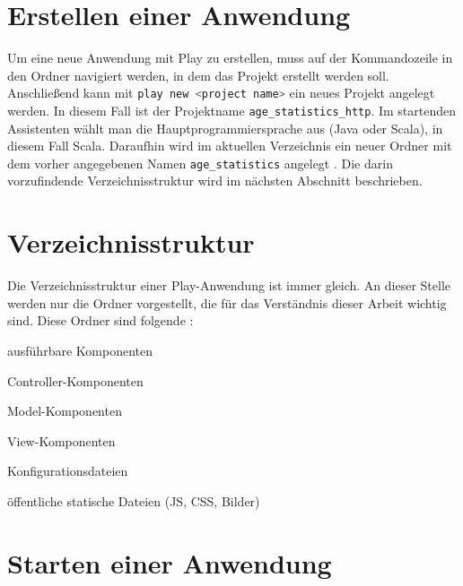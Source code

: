 

\section{Erstellen einer Anwendung} %
\label{sec:erstellen_einer_anwendung}

Um eine neue Anwendung mit Play zu erstellen, muss auf der Kommandozeile in den Ordner navigiert werden, in dem das Projekt erstellt werden soll.
Anschließend kann mit \lstinline[language=sh]|play new <project name>| ein neues Projekt angelegt werden.
In diesem Fall ist der Projektname \lstinline|age_statistics_http|.
Im startenden Assistenten wählt man die Hauptprogrammiersprache aus (Java oder Scala), in diesem Fall Scala.
Daraufhin wird im aktuellen Verzeichnis ein neuer Ordner mit dem vorher angegebenen Namen \lstinline|age_statistics| angelegt \cite[vgl.][S.~10]{play_for_scala}.
Die darin vorzufindende Verzeichnisstruktur wird im nächsten Abschnitt beschrieben.



\section{Verzeichnisstruktur} %
\label{sec:verzeichnisstruktur}

Die Verzeichnisstruktur einer Play-Anwendung ist immer gleich.
An dieser Stelle werden nur die Ordner vorgestellt, die für das Verständnis dieser Arbeit wichtig sind.
Diese Ordner sind folgende \cite[vgl.][]{play_verzeichnisstruktur}:

\begin{description}[leftmargin=!,labelwidth=\widthof{\bfseries app/controllers/}]
  \item[app/] ausführbare Komponenten
  \item[app/controllers/] Controller-Komponenten
  \item[app/models/] Model-Komponenten
  \item[app/views/] View-Komponenten
  \item[conf/] Konfigurationsdateien
  \item[public/] öffentliche statische Dateien (JS, CSS, Bilder)
\end{description}



\section{Starten einer Anwendung} %
\label{sec:starten_einer_anwendung}


